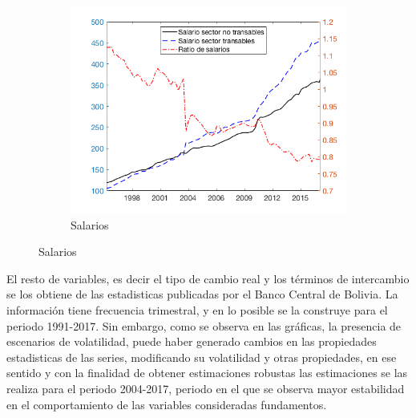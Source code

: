\documentclass[12pt,letterpaper]{article}
\begin{document}
\begin{figure}
\begin{subfigure}[b]{0.4\textwidth}
        \includegraphics[width=\textwidth]{fig13}
        \caption{Salarios}
    \end{subfigure}
\end{figure}
El resto de variables, es decir el tipo de cambio real y los términos de intercambio se los obtiene de las estadisticas publicadas por el Banco Central de Bolivia. La información tiene frecuencia trimestral, y en lo posible se la construye para el periodo 1991-2017. Sin embargo, como se observa en las gráficas, la presencia de escenarios de volatilidad, puede haber generado cambios en las propiedades estadisticas de las series, modificando su volatilidad y otras propiedades, en ese sentido y con la finalidad de obtener estimaciones robustas las estimaciones se las realiza para el periodo 2004-2017, periodo en el que se observa mayor estabilidad en el comportamiento de las variables consideradas fundamentos.
\end{document}
